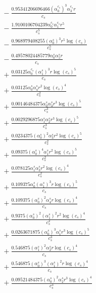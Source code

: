 \documentclass[10pt]{article}
\begin{document}
\begin{align*}
&{}  - \frac{0.95341206696466 \left(\alpha_{0}^{c_s}\right)^{3} \alpha_{3}^{c_s} r}{c_{s}} \\
&{}  - \frac{1.9100106704239 \alpha_{0}^{c_s} \alpha_{1}^{c_s} r^{5}}{c_{s}^{5}} \\
&{}  - \frac{0.968979408255 \left(\alpha_{0}^s\right)^{3} r^{5} \log{\left(c_{s} \right)}}{c_{s}^{5}} \\
&{}  - \frac{0.49578024485779 \alpha_{0}^s \alpha_{5}^s r}{c_{s}} \\
&{}  + \frac{0.03125 \alpha_{0}^{c_s} \left(\alpha_{1}^s\right)^{3} r \log{\left(c_{s} \right)}^{5}}{c_{s}} \\
&{}  + \frac{0.03125 \alpha_{0}^s \alpha_{4}^s r^{2} \log{\left(c_{s} \right)}^{4}}{c_{s}^{2}} \\
&{}  + \frac{0.00146484375 \alpha_{0}^s \alpha_{3}^s r^{3} \log{\left(c_{s} \right)}^{5}}{c_{s}^{3}} \\
&{}  + \frac{0.0029296875 \alpha_{1}^s \alpha_{2}^s r^{3} \log{\left(c_{s} \right)}^{5}}{c_{s}^{3}} \\
&{}  + \frac{0.0234375 \left(\alpha_{0}^s\right)^{2} \alpha_{3}^s r^{2} \log{\left(c_{s} \right)}^{5}}{c_{s}^{2}} \\
&{}  + \frac{0.09375 \left(\alpha_{0}^s\right)^{4} \alpha_{1}^s r^{2} \log{\left(c_{s} \right)}^{5}}{c_{s}^{2}} \\
&{}  + \frac{0.078125 \alpha_{1}^s \alpha_{3}^s r^{2} \log{\left(c_{s} \right)}^{4}}{c_{s}^{2}} \\
&{}  + \frac{0.109375 \alpha_{0}^s \left(\alpha_{1}^s\right)^{3} r \log{\left(c_{s} \right)}^{5}}{c_{s}} \\
&{}  + \frac{0.109375 \left(\alpha_{0}^s\right)^{2} \alpha_{4}^s r \log{\left(c_{s} \right)}^{4}}{c_{s}} \\
&{}  + \frac{0.9375 \left(\alpha_{0}^s\right)^{2} \left(\alpha_{1}^s\right)^{2} r^{2} \log{\left(c_{s} \right)}^{4}}{c_{s}^{2}} \\
&{}  + \frac{0.0263671875 \left(\alpha_{0}^s\right)^{3} \alpha_{1}^s r^{3} \log{\left(c_{s} \right)}^{5}}{c_{s}^{3}} \\
&{}  + \frac{0.546875 \left(\alpha_{1}^s\right)^{2} \alpha_{2}^s r \log{\left(c_{s} \right)}^{4}}{c_{s}} \\
&{}  + \frac{0.546875 \left(\alpha_{0}^s\right)^{3} \left(\alpha_{1}^s\right)^{2} r \log{\left(c_{s} \right)}^{4}}{c_{s}} \\
&{}  + \frac{0.09521484375 \left(\alpha_{0}^s\right)^{2} \alpha_{2}^s r^{3} \log{\left(c_{s} \right)}^{4}}{c_{s}^{3}} \\

\end{align*}
\end{document}
